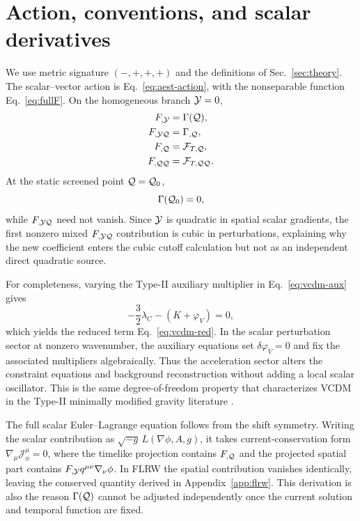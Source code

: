 \section{Action, conventions, and scalar derivatives}\label{app:action}
We use metric signature $(-,+,+,+)$ and the definitions of Sec.~\ref{sec:theory}. The scalar--vector action is Eq.~\eqref{eq:aest-action}, with the nonseparable function Eq.~\eqref{eq:fullF}. On the homogeneous branch $\mathcal{Y}=0$,
\begin{align}
F_{,\mathcal{Y}}&=\Gamma(\mathcal{Q}),\\
F_{,\mathcal{Y}\mathcal{Q}}&=\Gamma_{,\mathcal{Q}},\\
F_{,\mathcal{Q}}&=\mathcal F_{T,\mathcal{Q}},\\
F_{,\mathcal{Q}\mathcal{Q}}&=\mathcal F_{T,\mathcal{Q}\mathcal{Q}}.
\end{align}
At the static screened point $\mathcal{Q}=\mathcal{Q}_0$,
\begin{equation}
\Gamma(\mathcal{Q}_0)=0,
\end{equation}
while $F_{,\mathcal{Y}\mathcal{Q}}$ need not vanish. Since $\mathcal{Y}$ is quadratic in spatial scalar gradients, the first nonzero mixed $F_{,\mathcal{Y}\mathcal{Q}}$ contribution is cubic in perturbations, explaining why the new coefficient enters the cubic cutoff calculation but not as an independent direct quadratic source.

For completeness, varying the Type-II auxiliary multiplier in Eq.~\eqref{eq:vcdm-aux} gives
\begin{equation}
-\frac32\lambda_C-(K+\varphi_V)=0,
\end{equation}
which yields the reduced term Eq.~\eqref{eq:vcdm-red}. In the scalar perturbation sector at nonzero wavenumber, the auxiliary equations set $\delta\varphi_V=0$ and fix the associated multipliers algebraically. Thus the acceleration sector alters the constraint equations and background reconstruction without adding a local scalar oscillator. This is the same degree-of-freedom property that characterizes VCDM in the Type-II minimally modified gravity literature \cite{DeFeliceMaedaMukohyamaPookkillath2022,GanzMartensMukohyamaNamba2023}.

The full scalar Euler--Lagrange equation follows from the shift symmetry. Writing the scalar contribution as $\sqrt{-g}\,L(\nabla\phi,A,g)$, it takes current-conservation form $\nabla_\mu \mathcal J^\mu_\phi=0$, where the timelike projection contains $F_{,\mathcal{Q}}$ and the projected spatial part contains $F_{,\mathcal{Y}}q^{\mu\nu}\nabla_\nu\phi$. In FLRW the spatial contribution vanishes identically, leaving the conserved quantity derived in Appendix~\ref{app:flrw}. This derivation is also the reason $\Gamma(\mathcal{Q})$ cannot be adjusted independently once the current solution and temporal function are fixed.
